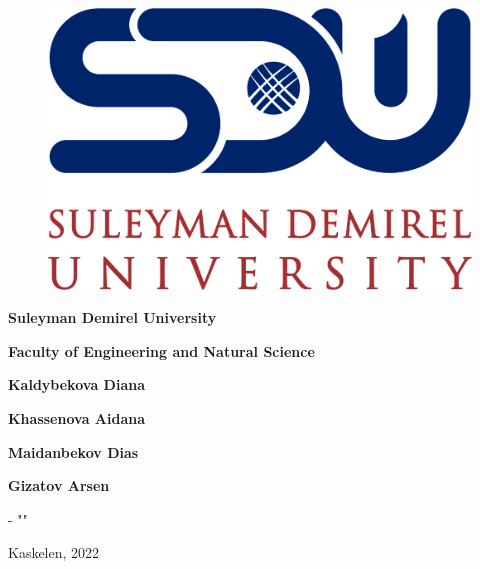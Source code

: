 \begin{titlepage}
\begin{center}
\large
\vspace{1cm}
\begin{figure}[h]
    \centering
    \includegraphics[scale=0.2]{figures/logoNew.png}
\end{figure}

\textbf{Suleyman Demirel University}

\textbf{Faculty of Engineering and Natural Science}

\vspace{5cm}
\huge
\textbf{\diplomaproject}

\vspace{1cm}
\normalsize
\mytitle

\vspace{1cm}
\normalsize
\begin{center}
    \textbf{Kaldybekova Diana}
    
    \textbf{Khassenova Aidana} 
    
    \textbf{Maidanbekov Dias}
    
    \textbf{Gizatov Arsen} 
\end{center}


\vspace{1cm}
\normalsize
\mydegreecode - "\mydegree"


\vfill
Kaskelen, 2022

\end{center}
\end{titlepage}